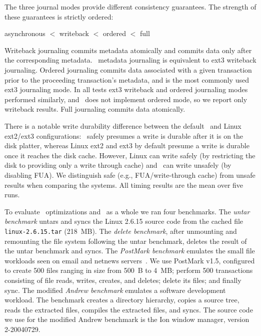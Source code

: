 The three journal modes provide different consistency guarantees.
The strength of these guarantees is strictly ordered:
\vspace{-0.5\baselineskip}
\begin{center}
asynchronous $<$ writeback $<$ ordered $<$ full
\end{center}
\vspace{-0.5\baselineskip}
Writeback journaling commits metadata atomically and commits data only
after the corresponding metadata. \Kudos\ metadata journaling is
equivalent to ext3 writeback journaling.
%
Ordered journaling commits data associated with a given transaction
prior to the proceeding transaction's metadata, and is the most
commonly used ext3 journaling mode.
%
In all tests ext3 writeback and ordered journaling modes performed
similarly, and \Kudos\ does not implement ordered mode, so we report
only writeback results.
%
Full journaling commits data atomically.

There is a notable write durability difference between the default
\Kudos\ and Linux ext2/ext3 configurations: \Kudos\ safely presumes a write
is durable after it is on the disk platter, whereas Linux ext2 and
ext3 by default presume a write is durable once it reaches the disk cache. However, Linux can write
safely (by restricting the disk to providing only a write through
cache) and \Kudos\ can write unsafely (by disabling FUA).
%
We distinguish safe (e.g., FUA/write-through cache) from unsafe results
when comparing the systems.
%
All timing results are the mean over five runs.

To evaluate \patch\ optimizations and \Kudos\ as a whole we ran four
benchmarks.
%
The \emph{untar benchmark} untars and syncs the Linux 2.6.15 source code
from the cached file \texttt{linux-2.6.15.tar} (218~MB).
%
The \emph{delete benchmark}, after unmounting and remounting the file
system following the untar benchmark, deletes the result of the untar
benchmark and syncs.
%
The \emph{PostMark benchmark} emulates the small file workloads seen
on email and netnews servers~\cite{postmark}. We use PostMark v1.5,
configured to create 500 files ranging in size from 500~B to 4~MB;
perform 500 transactions consisting of file reads, writes, creates,
and deletes; delete its files; and finally sync.
%
The modified \emph{Andrew benchmark} emulates a software development
workload.  The benchmark creates a directory hierarchy, copies a
source tree, reads the extracted files, compiles the extracted files,
and syncs. The source code we use for the modified Andrew benchmark is
the Ion window manager, version 2-20040729.

